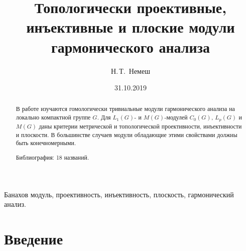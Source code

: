 \documentclass{article}
\numberwithin{equation}{section}
\theoremstyle{plain}
\theoremstyle{definition}
\begin{document}
\title{
    Топологически проективные, инъективные и 
    плоские модули гармонического анализа
}
\author[N.\,T.~Nemesh]{Н.\,Т.~Немеш}
\address{Московский государственный университет им.~М.\,В.~Ломоносова}

\date{31.10.2019}

\maketitle

\begin{fulltext}

\begin{abstract} В работе изучаются гомологически тривиальные модули 
гармонического анализа на локально компактной группе $G$. Для $L_1(G)$- и 
$M(G)$-модулей $C_0(G)$, $L_p(G)$ и $M(G)$ даны критерии метрической и 
топологической проективности, инъективности и плоскости. В большинстве случаев 
модули обладающие этими свойствами должны быть конечномерными.

Библиография: 18 названий.
\end{abstract}

\begin{keywords} 
Банахов модуль, проективность, инъективность, плоскость, гармонический анализ.
\end{keywords}




\section{Введение}\label{SectionIntroduction}


\end{fulltext}
\end{document}
